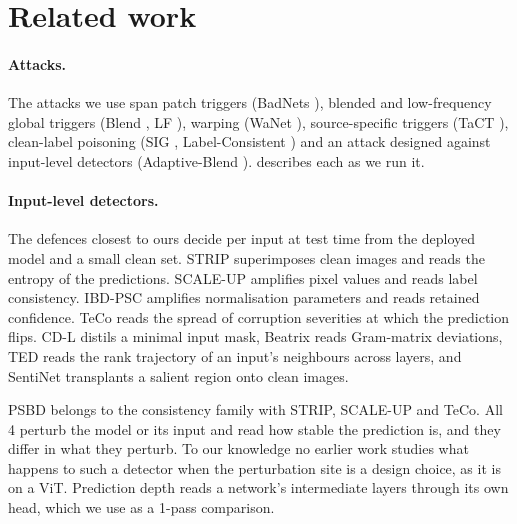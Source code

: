 \section{Related work}
\label{sec:related}

\paragraph{Attacks.}
The attacks we use span patch triggers (BadNets \cite{gu2017badnets}), blended and low-frequency global triggers (Blend \cite{chen2017targeted}, LF \cite{zeng2021lf}), warping (WaNet \cite{nguyen2021wanet}), source-specific triggers (TaCT \cite{tang2021demon}), clean-label poisoning (SIG \cite{barni2019sig}, Label-Consistent \cite{turner2019label}) and an attack designed against input-level detectors (Adaptive-Blend \cite{qi2023adaptive}).  describes each as we run it.

\paragraph{Input-level detectors.}
The defences closest to ours decide per input at test time from the deployed model and a small clean set. STRIP \cite{gao2019strip} superimposes clean images and reads the entropy of the predictions. SCALE-UP \cite{guo2023scale} amplifies pixel values and reads label consistency. IBD-PSC \cite{hou2024ibdpsc} amplifies normalisation parameters and reads retained confidence. TeCo \cite{liu2023teco} reads the spread of corruption severities at which the prediction flips. CD-L \cite{huang2023distilling} distils a minimal input mask, Beatrix \cite{ma2023beatrix} reads Gram-matrix deviations, TED \cite{mo2024ted} reads the rank trajectory of an input's neighbours across layers, and SentiNet \cite{chou2020sentinet} transplants a salient region onto clean images.

PSBD \cite{li2025psbd} belongs to the consistency family with STRIP, SCALE-UP and TeCo. All 4 perturb the model or its input and read how stable the prediction is, and they differ in what they perturb. To our knowledge no earlier work studies what happens to such a detector when the perturbation site is a design choice, as it is on a ViT. Prediction depth \cite{baldock2021difficulty} reads a network's intermediate layers through its own head, which we use as a 1-pass comparison.

